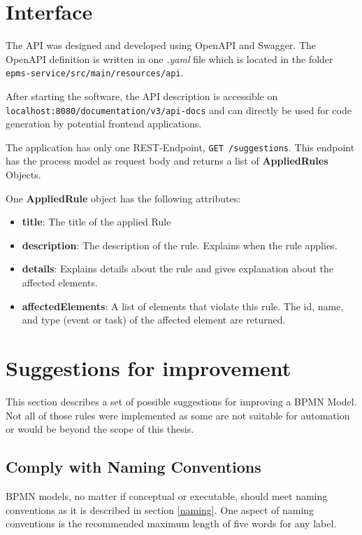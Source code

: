 \section{Interface}
The API was designed and developed using OpenAPI and Swagger\cite{swagger}. The OpenAPI definition is written in one \textit{.yaml} file which is located in the folder\\ \verb|epms-service/src/main/resources/api|.

After starting the software, the API description is accessible on \\ \verb|localhost:8080/documentation/v3/api-docs| and can directly be used for code generation by potential frontend applications. 

The application has only one REST-Endpoint, \verb|GET /suggestions|. This endpoint has the process model as request body and returns a list of \textbf{AppliedRules} Objects. 

One \textbf{AppliedRule} object has the following attributes:
\begin{itemize}
	\item \textbf{title}: The title of the applied Rule
	\item \textbf{description}: The description of the rule. Explains when the rule applies.
	\item \textbf{details}: Explains details about the rule and gives explanation about the affected elements.
	\item \textbf{affectedElements}: A list of elements that violate this rule. The id, name, and type (event or task) of the affected element are returned.
\end{itemize} 
\section{Suggestions for improvement}\label{last}
This section describes a set of possible suggestions for improving a BPMN Model. Not all of those rules were implemented as some are not suitable for automation or would be beyond the scope of this thesis. 

\subsection{Comply with Naming Conventions}\label{naming-con}
BPMN models, no matter if conceptual or executable, should meet naming conventions as it is described in section \ref{naming}. One aspect of naming conventions is the recommended maximum length of five words for any label. 

